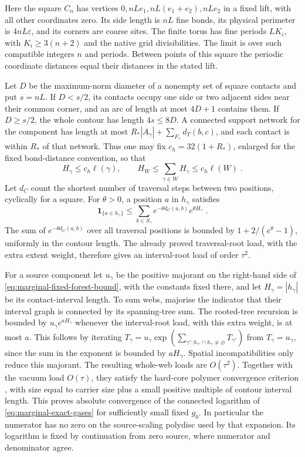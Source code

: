 \documentclass[11pt]{article}
\begin{document}
Here the square $C_n$ has vertices $0,nLe_1,nL(e_1+e_2),nLe_2$ in a fixed lift, with all other coordinates zero. Its side length is $nL$ fine bonds, its physical perimeter is $4nL\varepsilon$, and its corners are coarse sites. The finite torus has fine periods $LK_i$, with $K_i\geq 3(n+2)$ and the native grid divisibilities. The limit is over such compatible integers $n$ and periods. Between points of this square the periodic coordinate distances equal their distances in the stated lift.

Let $D$ be the maximum-norm diameter of a nonempty set of square contacts and put $s=nL$. If $D<s/2$, its contacts occupy one side or two adjacent sides near their common corner, and an arc of length at most $4D+1$ contains them. If $D\geq s/2$, the whole contour has length $4s\leq 8D$. A connected support network for the component has length at most $R_*|A_\gamma|+\sum_{F_\gamma}d_T(b,c)$, and each contact is within $R_*$ of that network. Thus one may fix $c_h=32(1+R_*)$, enlarged for the fixed bond-distance convention, so that
\begin{equation}\label{eq:marginal-hull-extent}
    H_\gamma\leq c_h\ell(\gamma),
    \qquad H_W\leq \sum_{\gamma\in W}H_\gamma
        \leq c_h\ell(W)\;.
\end{equation}
Let $d_C$ count the shortest number of traversal steps between two positions, cyclically for a square. For $\theta>0$, a position $a$ in $h_\gamma$ satisfies
\begin{equation}\label{eq:marginal-hull-root}
    \mathbf1_{\{a\in h_\gamma\}}
        \leq \sum_{b\in S_\gamma}
            e^{-\theta d_C(a,b)}e^{\theta H_\gamma}\;.
\end{equation}
The sum of $e^{-\theta d_C(a,b)}$ over all traversal positions is bounded by $1+2/(e^\theta-1)$, uniformly in the contour length. The already proved traversal-root load, with the extra extent weight, therefore gives an interval-root load of order $\tau^2$.

For a source component let $u_\gamma$ be the positive majorant on the right-hand side of \eqref{eq:marginal-fixed-forest-bound}, with the constants fixed there, and let $H_\gamma=|h_\gamma|$ be its contact-interval length. To sum webs, majorise the indicator that their interval graph is connected by its spanning-tree sum. The rooted-tree recursion is bounded by $u_\gamma e^{aH_\gamma}$ whenever the interval-root load, with this extra weight, is at most $a$. This follows by iterating $T_\gamma=u_\gamma\exp(\sum_{\gamma':h_{\gamma'}\cap h_\gamma\ne \varnothing}T_{\gamma'})$ from $T_\gamma=u_\gamma$, since the sum in the exponent is bounded by $aH_\gamma$. Spatial incompatibilities only reduce this majorant. The resulting whole-web loads are $O(\tau^2)$. Together with the vacuum load $O(\tau)$, they satisfy the hard-core polymer convergence criterion \cite{KoteckyPreiss}, with size equal to carrier size plus a small positive multiple of contour interval length. This proves absolute convergence of the connected logarithm of \eqref{eq:marginal-exact-gases} for sufficiently small fixed $g_0$. In particular the numerator has no zero on the source-scaling polydisc used by that expansion. Its logarithm is fixed by continuation from zero source, where numerator and denominator agree.
\end{document}
